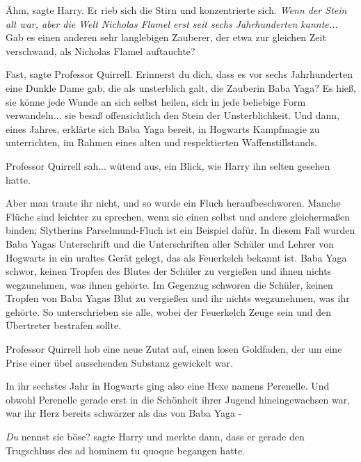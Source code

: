 \glqq{}Ähm\grqq{}, sagte Harry. Er rieb sich die Stirn und konzentrierte sich.
\emph{Wenn der Stein alt war, aber die Welt Nicholas Flamel erst seit sechs
Jahrhunderten kannte...} \glqq{}Gab es einen anderen sehr langlebigen Zauberer,
der etwa zur gleichen Zeit verschwand, als Nicholas Flamel auftauchte?\grqq{}

\glqq{}Fast\grqq{}, sagte Professor Quirrell. \glqq{}Erinnerst du dich, dass es
vor sechs Jahrhunderten eine Dunkle Dame gab, die als unsterblich galt, die
Zauberin Baba Yaga? Es hieß, sie könne jede Wunde an sich selbst heilen, sich in
jede beliebige Form verwandeln... sie besaß offensichtlich den Stein der
Unsterblichkeit. Und dann, eines Jahres, erklärte sich Baba Yaga bereit, in
Hogwarts Kampfmagie zu unterrichten, im Rahmen eines alten und respektierten
Waffenstillstands.\grqq{}

Professor Quirrell sah... wütend aus, ein Blick, wie Harry ihn selten gesehen
hatte.

\glqq{}Aber man traute ihr nicht, und so wurde ein Fluch heraufbeschworen. Manche
Flüche sind leichter zu sprechen, wenn sie einen selbst und andere gleichermaßen
binden; Slytherins Parselmund-Fluch ist ein Beispiel dafür. In diesem Fall
wurden Baba Yagas Unterschrift und die Unterschriften aller Schüler und Lehrer
von Hogwarts in ein uraltes Gerät gelegt, das als Feuerkelch bekannt ist. Baba
Yaga schwor, keinen Tropfen des Blutes der Schüler zu vergießen und ihnen nichts
wegzunehmen, was ihnen gehörte. Im Gegenzug schworen die Schüler, keinen Tropfen
von Baba Yagas Blut zu vergießen und ihr nichts wegzunehmen, was ihr gehörte. So
unterschrieben sie alle, wobei der Feuerkelch Zeuge sein und den Übertreter
bestrafen sollte.\grqq{}

Professor Quirrell hob eine neue Zutat auf, einen losen Goldfaden, der um eine
Prise einer übel aussehenden Substanz gewickelt war.

\glqq{}In ihr sechstes Jahr in Hogwarts ging also eine Hexe namens Perenelle. Und
obwohl Perenelle gerade erst in die Schönheit ihrer Jugend hineingewachsen war,
war ihr Herz bereits schwärzer als das von Baba Yaga -\grqq{}

\glqq{}\emph{Du} nennst sie böse?\grqq{} sagte Harry und merkte dann, dass er
gerade den Trugschluss des ad hominem tu quoque begangen hatte.

